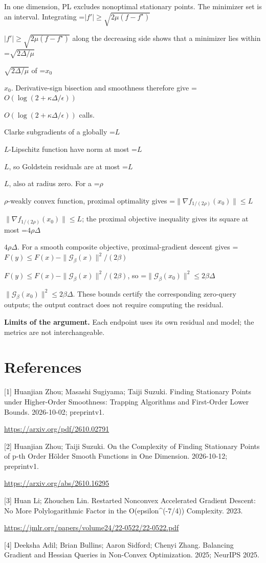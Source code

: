 \documentclass[10pt,a4paper]{article}
\newcommand{\AtlasMath}[1]{\par\begingroup\centering\setbox0=\hbox{$\displaystyle #1$}\ifdim\wd0>1.4\linewidth\typeout{ATLAS WIDE FORMULA: \the\wd0}\fi\ifdim\wd0>\linewidth\resizebox{\linewidth}{!}{\box0}\else\box0\fi\par\endgroup}
\newcommand{\AtlasInlineMath}[1]{\begingroup\setbox0=\hbox{$#1$}\ifdim\wd0>.4\linewidth\endgroup\AtlasMath{#1}\else\endgroup$#1$\fi}
\begin{document}
In one dimension, PL excludes nonoptimal stationary points. The minimizer set is an interval. Integrating
\AtlasInlineMath{|f'|\ge\sqrt{2\mu(f-f^\star)}}
along the decreasing side shows that a minimizer lies within \AtlasInlineMath{\sqrt{2\Delta/\mu}} of \AtlasInlineMath{x_0}. Derivative-sign bisection and smoothness therefore give \AtlasInlineMath{O(\log(2+\kappa\Delta/\epsilon))} calls.

Clarke subgradients of a globally \AtlasInlineMath{L}-Lipschitz function have norm at most \AtlasInlineMath{L}, so Goldstein residuals are at most \AtlasInlineMath{L}, also at radius zero. For a \AtlasInlineMath{\rho}-weakly convex function, proximal optimality gives
\AtlasInlineMath{\|\nabla f_{1/(2\rho)}(x_0)\|\le L}; the proximal objective inequality gives its square at most \AtlasInlineMath{4\rho\Delta}.
For a smooth composite objective, proximal-gradient descent gives
\AtlasInlineMath{F(y)\le F(x)-\|\mathcal G_\beta(x)\|^2/(2\beta)},
so \AtlasInlineMath{\|\mathcal G_\beta(x_0)\|^2\le2\beta\Delta}.
These bounds certify the corresponding zero-query outputs; the output contract does not require computing the residual.

\textbf{Limits of the argument.} Each endpoint uses its own residual and model; the metrics are not interchangeable.

\section{References}
[1] Huanjian Zhou; Masashi Sugiyama; Taiji Suzuki. Finding Stationary Points under Higher-Order Smoothness: Trapping Algorithms and First-Order Lower Bounds. 2026-10-02; preprintv1.

\url{https://arxiv.org/pdf/2610.02791}

[2] Huanjian Zhou; Taiji Suzuki. On the Complexity of Finding Stationary Points of p-th Order Hölder Smooth Functions in One Dimension. 2026-10-12; preprintv1.

\url{https://arxiv.org/abs/2610.16295}

[3] Huan Li; Zhouchen Lin. Restarted Nonconvex Accelerated Gradient Descent: No More Polylogarithmic Factor in the O(epsilon\textasciicircum{}(-7/4)) Complexity. 2023.

\url{https://jmlr.org/papers/volume24/22-0522/22-0522.pdf}

[4] Deeksha Adil; Brian Bullins; Aaron Sidford; Chenyi Zhang. Balancing Gradient and Hessian Queries in Non-Convex Optimization. 2025; NeurIPS 2025.
\end{document}
